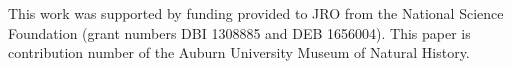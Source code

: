 This work was supported by funding provided to JRO from the National Science
Foundation (grant numbers DBI 1308885 and DEB 1656004).
This paper is contribution number  of the Auburn University
Museum of Natural History.

